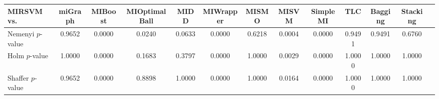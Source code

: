 \begin{threeparttable}
\begin{tabular}{lcccccccccccc}
\toprule
MIRSVM vs. &miGraph &MIBoost &MIOptimalBall &MIDD &MIWrapper &MISMO &MISVM &SimpleMI &TLC &Bagging &Stacking \\
\midrule
Nemenyi $p$-value &0.9652 &0.0000 &0.0240 &0.0633 &0.0000 &0.6218 &0.0004 &0.0000 &0.9491 &0.9491 &0.6760 &  \\
Holm $p$-value &1.0000 &0.0000 &0.1683 &0.3797 &0.0000 &1.0000 &0.0029 &0.0000 &1.0000 &1.0000 &1.0000 &  \\
Shaffer $p$-value &0.9652 &0.0000 &0.8898 &1.0000 &0.0000 &1.0000 &0.0164 &0.0000 &1.0000 &1.0000 &1.0000 &  \\
\bottomrule
\end{tabular}
\end{threeparttable}